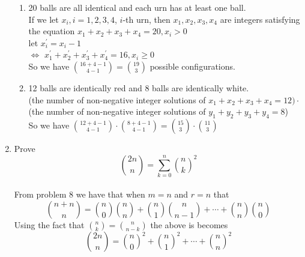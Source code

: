 \documentclass[12pt]{article}%
\newcommand{\0}{{\bf 0}}
\begin{document}
\begin{enumerate}
\begin{enumerate}
\item 20 balls are all identical and each urn has at least one ball.
\\
{\color{blue}{\bf Sol.}}
If we let $x_i, i = 1, 2, 3, 4$, $i$-th urn, then $x_1, x_2, x_3, x_4$ are integers satisfying the equation $x_1+x_2+x_3+x_4=20, x_i > 0$
\\
let $x_i^{'}=x_i-1$
\\
$\Leftrightarrow $  $x_1^{'}+x_2^{'}+x_3^{'}+x_4^{'}=16, x_i \ge 0$
\\So we have ${16+4-1\choose 4-1}={19\choose 3}$ possible configurations.
\item 12 balls are identically red and 8 balls are identically white.
\\
{\color{blue}{\bf Sol.}}
(the number of non-negative integer solutions of $x_1+x_2+x_3+x_4=12)\cdot$
(the number of non-negative integer solutions of $y_1+y_2+y_3+y_4=8$)
\\So we have ${12+4-1\choose 4-1}\cdot {8+4-1\choose 4-1}={15\choose 3}\cdot {11\choose 3}$
\end{enumerate}





































\item %
Prove
$$
{2n\choose n}=\sum_{k=0}^n{n\choose k}^2
$$
\\
{\color{blue}{\bf Sol.}}
From problem 8 we have that when $m = n$ and $r = n$ that
$$
{n+n\choose n}={n\choose 0}{n\choose n}+{n\choose 1}{n\choose n-1}+\cdots+{n\choose n}{n\choose 0}$$
Using the fact that ${n\choose k}={n\choose n-k}$ the above is becomes
$$
{2n\choose n}={n\choose 0}^2+{n\choose 1}^2+\cdots+{n\choose n}^2$$




\end{enumerate}
\end{document}
